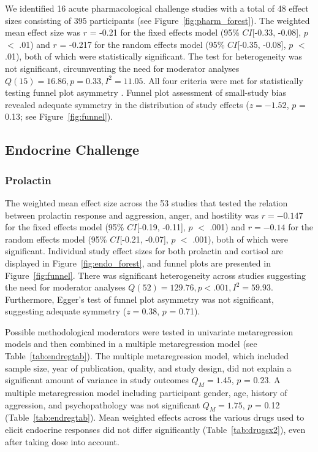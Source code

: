\documentclass[man]{apa6}\usepackage{graphicx, color}
\begin{document}
We identified 16 acute pharmacological challenge studies with a total of 48 effect sizes consisting of $395$ participants (see Figure~\ref{fig:pharm_forest}). The weighted mean effect size was $r$ = -0.21 for the fixed effects model (95\% $CI$[-0.33, -0.08], $p$ $<$ .01) and $r$ = -0.217 for the random effects model (95\% $CI$[-0.35, -0.08], $p$ $<$ .01), both of which were statistically significant. The test for heterogeneity was not significant, circumventing the need for moderator analyses \ensuremath{Q(15) = 16.86, p = 0.33, I^2 = 11.05}. All four criteria were met for statistically testing funnel plot asymmetry \parencite[see][]{Ioannidis2007}. Funnel plot assessment of small-study bias revealed adequate symmetry in the distribution of study effects ($z = -1.52$, $p$ = 0.13; see Figure~\ref{fig:funnel}).


\subsection{Endocrine Challenge}


\subsubsection{Prolactin}
The weighted mean effect size across the 53 studies that tested the relation between  prolactin response and aggression, anger, and hostility was $r = -0.147$ for the fixed effects model (95\% $CI$[-0.19, -0.11], $p$ $<$ .001) and $r = -0.14$ for the random effects model (95\% $CI$[-0.21, -0.07], $p$ $<$ .001), both of which were significant. Individual study effect sizes for both prolactin and cortisol are displayed in Figure~\ref{fig:endo_forest}, and funnel plots are presented in Figure~\ref{fig:funnel}. There was significant heterogeneity across studies suggesting the need for moderator analyses \ensuremath{Q(52) = 129.76, p < .001, I^2 = 59.93}. Furthermore, Egger's test of funnel plot asymmetry was not significant, suggesting adequate symmetry ($z = 0.38$, $p$ = 0.71). 


Possible methodological moderators were tested in univariate metaregression models and then combined in a multiple metaregression model (see Table~\ref{tab:endregtab}). The multiple metaregression model, which included sample size, year of publication, quality, and study design, did not explain a significant amount of variance in study outcomes $Q_M = 1.45$, $p$ = 0.23. A multiple metaregression model including participant gender, age, history of aggression, and psychopathology was not significant $Q_M = 1.75$, $p$ = 0.12 (Table~\ref{tab:endregtab}). Mean weighted effects across the various drugs used to elicit endocrine responses did not differ significantly (Table~\ref{tab:drugsx2}), even after taking dose into account.
\end{document}
